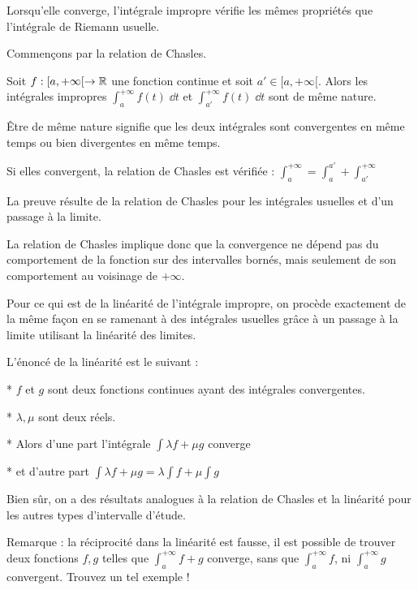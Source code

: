 Lorsqu'elle converge, l'intégrale impropre vérifie les mêmes 
propriétés que l'intégrale de Riemann usuelle.

Commençons par la relation de Chasles.

\change

Soit $f : [a,+\infty[ \to \mathbb{R}$ une fonction continue et soit
  $a' \in [a,+\infty[$. 
  Alors les intégrales impropres $\int_a^{+\infty} f(t) \;\dd t$ 
  et $\int_{a'}^{+\infty} f(t) \;\dd t $ sont de même nature. 

\og{}\^Etre de même nature  \fg{}  signifie que les deux intégrales 
sont convergentes en même temps ou bien divergentes en même temps.

\change

Si elles convergent, la relation de Chasles est vérifiée :
$\int_a^{+\infty}  = \int_{a}^{a'} + \int_{a'}^{+\infty}$ 

La preuve résulte de la relation de Chasles pour les intégrales 
usuelles et d'un passage à la limite.

La relation de Chasles implique donc que la convergence ne dépend
pas du comportement de la fonction sur des intervalles bornés,
mais seulement de son comportement au voisinage de $+\infty$.



\diapo
Pour ce qui est de la linéarité de l'intégrale impropre, on procède exactement 
de la même façon en se ramenant à des intégrales usuelles grâce à un passage 
à la limite utilisant la linéarité des limites.

L'énoncé de la linéarité est le suivant :

* $f$ et $g$ sont deux fonctions continues 
ayant des intégrales convergentes.

* $\lambda,\mu$ sont deux réels. 

* Alors d'une part l'intégrale 
$\int \lambda f + \mu g$ converge 

* et d'autre part 
$\int \lambda f + \mu g = \lambda\int  f  + \mu \int  g $

Bien sûr, on a des résultats analogues à la relation de Chasles 
et la linéarité 
pour les autres types d'intervalle d'étude.

Remarque : la réciprocité dans la linéarité est fausse,
il est possible de trouver deux fonctions $f,g$ telles que
$\int_a^{+\infty} f+g$ converge, sans que $\int_a^{+\infty} f$, ni
$\int_a^{+\infty} g$ convergent. Trouvez un tel exemple !

